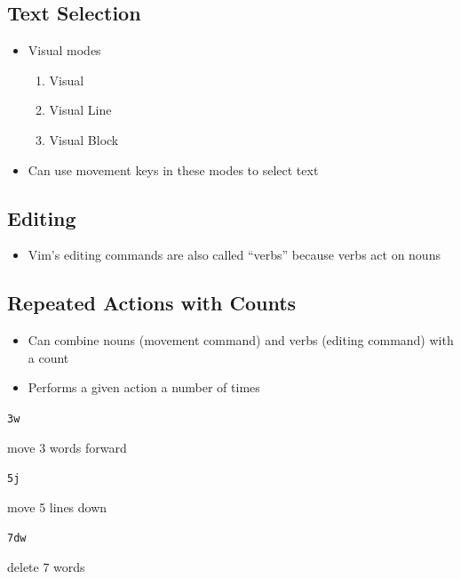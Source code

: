 \documentclass[letterpaper,12pt]{article}
\newcommand*{\lstitem}[1]{
  \setbox0\hbox{\lstinline{#1}}
  \item[\usebox0]
}
\begin{document}
\subsection{Text Selection}
\begin{itemize}
 \item Visual modes
       \begin{enumerate}
        \item Visual
        \item Visual Line
        \item Visual Block
       \end{enumerate}
 \item Can use movement keys in these modes to select text
\end{itemize}

\subsection{Editing}
\begin{itemize}
 \item Vim's editing commands are also called ``verbs'' because verbs act on nouns
\end{itemize}


\subsection{Repeated Actions with Counts}
\begin{itemize}
 \item Can combine nouns (movement command) and verbs (editing command) with a count
 \item Performs a given action a number of times
\end{itemize}

\begin{description}
 \lstitem{3w} move 3 words forward
 \lstitem{5j} move 5 lines down
 \lstitem{7dw} delete 7 words
\end{description}
\end{document}
